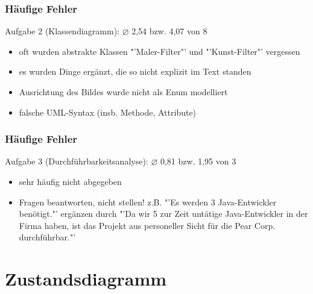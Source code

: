 \documentclass[18pt]{beamer}
\begin{document}
	\begin{frame}
		\frametitle{Häufige Fehler}
		\begin{block}{Aufgabe 2 (Klassendiagramm): $\diameter$ 2,54 bzw. 4,07 von 8}
			\begin{itemize}
				\item oft wurden abstrakte Klassen "'Maler-Filter"' und "'Kunst-Filter"' vergessen
				\pause
				\item es wurden Dinge ergänzt, die so nicht explizit im Text standen
				\pause
				\item Ausrichtung des Bildes wurde nicht als Enum modelliert
				\pause
				\item falsche UML-Syntax (insb. Methode, Attribute)
			\end{itemize}
		\end{block}
	\end{frame}

	\begin{frame}
		\frametitle{Häufige Fehler}
		\begin{block}{Aufgabe 3 (Durchführbarkeitsanalyse): $\diameter$ 0,81 bzw. 1,95 von 3}
			\begin{itemize}
				\item sehr häufig nicht abgegeben
				\pause
				\item Fragen beantworten, nicht stellen!
				\linebreak z.B. "'Es werden 3 Java-Entwickler benötigt."' ergänzen durch
				"'Da wir 5 zur Zeit untätige Java-Entwickler in der Firma haben, ist das Projekt aus personeller Sicht für die Pear Corp. durchführbar."'
			\end{itemize}
		\end{block}
	\end{frame}


\section{Zustandsdiagramm}
\end{document}
